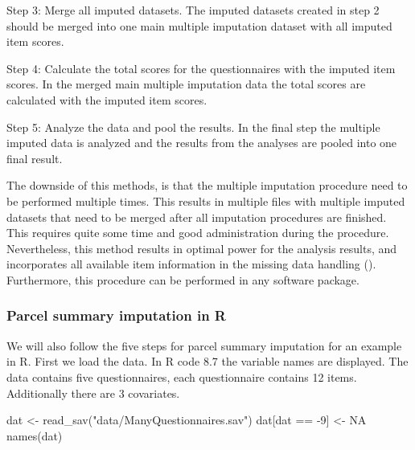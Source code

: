 \documentclass[
]{book}
\newenvironment{Shaded}{\begin{snugshade}}{\end{snugshade}}
\newcommand{\ConstantTok}[1]{\textcolor[rgb]{0.00,0.00,0.00}{#1}}
\newcommand{\DecValTok}[1]{\textcolor[rgb]{0.00,0.00,0.81}{#1}}
\newcommand{\FunctionTok}[1]{\textcolor[rgb]{0.00,0.00,0.00}{#1}}
\newcommand{\NormalTok}[1]{#1}
\newcommand{\OtherTok}[1]{\textcolor[rgb]{0.56,0.35,0.01}{#1}}
\newcommand{\SpecialCharTok}[1]{\textcolor[rgb]{0.00,0.00,0.00}{#1}}
\newcommand{\StringTok}[1]{\textcolor[rgb]{0.31,0.60,0.02}{#1}}
\begin{document}
Step 3: Merge all imputed datasets. The imputed datasets created in step 2 should be merged into one main multiple imputation dataset with all imputed item scores.

Step 4: Calculate the total scores for the questionnaires with the imputed item scores. In the merged main multiple imputation data the total scores are calculated with the imputed item scores.

Step 5: Analyze the data and pool the results. In the final step the multiple imputed data is analyzed and the results from the analyses are pooled into one final result.

The downside of this methods, is that the multiple imputation procedure need to be performed multiple times. This results in multiple files with multiple imputed datasets that need to be merged after all imputation procedures are finished. This requires quite some time and good administration during the procedure. Nevertheless, this method results in optimal power for the analysis results, and incorporates all available item information in the missing data handling (\citet{Eekhout2018}). Furthermore, this procedure can be performed in any software package.

\hypertarget{parcel-summary-imputation-in-r}{%
\subsubsection{Parcel summary imputation in R}\label{parcel-summary-imputation-in-r}}

We will also follow the five steps for parcel summary imputation for an example in R. First we load the data. In R code 8.7 the variable names are displayed. The data contains five questionnaires, each questionnaire contains 12 items. Additionally there are 3 covariates.

\begin{Shaded}
\begin{Highlighting}[]
\NormalTok{dat }\OtherTok{\textless{}{-}} \FunctionTok{read\_sav}\NormalTok{(}\StringTok{"data/ManyQuestionnaires.sav"}\NormalTok{)}
\NormalTok{dat[dat }\SpecialCharTok{==} \SpecialCharTok{{-}}\DecValTok{9}\NormalTok{] }\OtherTok{\textless{}{-}} \ConstantTok{NA}
\FunctionTok{names}\NormalTok{(dat)}
\end{Highlighting}
\end{Shaded}
\end{document}
